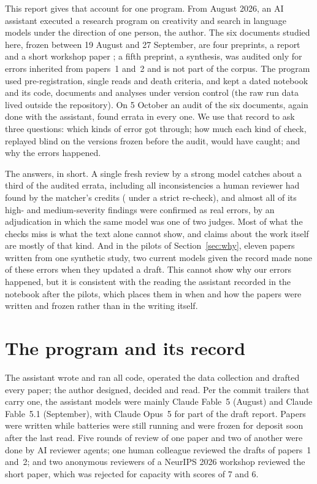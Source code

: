 \documentclass[11pt]{article}
\begin{document}
This report gives that account for one program. From August 2026, an AI assistant executed a research program on creativity and
search in language models under the direction of one person, the author. The six documents studied here, frozen between 19 August
and 27 September, are four preprints, a report and a short workshop paper
\citep{ono2026paper1,ono2026paper2,ono2026paper3,ono2026paper4,ono2026paper6,ono2026short}; a fifth preprint, a synthesis, was
audited only for errors inherited from papers~1 and~2 and is not part of the corpus.
The program used pre-registration, single reads and death criteria, and kept a dated notebook and its code, documents and
analyses under version control (the raw run data lived outside the repository). On 5 October an audit of the six documents, again done with the assistant, found errata in every one. We use
that record to ask three questions: which kinds of error got through; how much each kind of check, replayed blind on the versions
frozen before the audit, would have caught; and why the errors happened.

The answers, in short. A single fresh review by a strong model catches about a third of the audited errata, including all
\Njudge{} inconsistencies a human reviewer had found by the matcher's credits (\StrictJudgeOpusA{} under a strict re-check), and almost all of its high- and medium-severity findings were confirmed as real errors,
by an adjudication in which the same model was one of two judges. Most of what the checks miss is what the text alone cannot show, and claims about the work itself are mostly of that kind.
And in the pilots of Section~\ref{sec:why}, eleven papers written from one synthetic study, two current models given the record
made none of these errors when they updated a draft. This cannot show why our errors happened, but it is consistent with the reading the assistant recorded in the notebook
after the pilots, which places them in when and how the papers were written and frozen rather than in the writing itself.

\section{The program and its record}

The assistant wrote and ran all code, operated the data collection and drafted every paper; the author designed, decided and
read. Per the commit trailers that carry one, the assistant models were mainly Claude Fable~5 (August) and Claude Fable~5.1
(September), with Claude Opus~5 for part of the draft report. Papers were written while batteries were still running and were frozen
for deposit soon after the last read. Five rounds of review of one paper and two of another were done by AI reviewer agents; one
human colleague reviewed the drafts of papers~1 and~2; and two anonymous reviewers of a NeurIPS 2026 workshop reviewed the short paper,
which was rejected for capacity with scores of 7 and 6.
\end{document}
